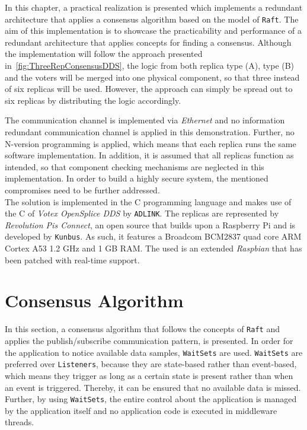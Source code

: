 In this chapter, a practical realization is presented which implements a redundant architecture that applies a consensus algorithm based on the model of \texttt{Raft}.
The aim of this implementation is to showcase the practicability and performance of a redundant architecture that applies  concepts for finding a consensus.
Although the implementation will follow the approach presented in~\autoref{fig:ThreeRepConsensusDDS}, the logic from both replica type (A), type (B) and the voters will be merged into one physical component, so that three instead of six replicas will be used.
However, the approach can simply be spread out to six replicas by distributing the logic accordingly.

The communication channel is implemented via \textit{Ethernet} and no information redundant communication channel is applied in this demonstration.
Further, no N-version programming is applied, which means that each replica runs the same software implementation.
In addition, it is assumed that all replicas function as intended, so that component checking mechanisms are neglected in this implementation.
In order to build a highly secure system, the mentioned compromises need to be further addressed.
\\

The solution is implemented in the C programming language and makes use of the C  of \textit{Votex OpenSplice DDS} by \texttt{ADLINK}.
The replicas are represented by \textit{Revolution Pis Connect}, an open source  that builds upon a Raspberry Pi and is developed by \texttt{Kunbus}.
As such, it features a Broadcom BCM2837 quad core ARM Cortex A53 1.2 GHz  and 1 GB RAM.
The used  is an extended \textit{Raspbian}  that has been patched with real-time support.


\section{Consensus Algorithm}

In this section, a consensus algorithm that follows the concepts of \texttt{Raft} and applies the  publish/subscribe communication pattern, is presented.
In order for the application to notice available data samples, \texttt{WaitSets} are used.
\texttt{WaitSets} are preferred over \texttt{Listeners}, because they are state-based rather than event-based, which means they trigger as long as a certain state is present rather than when an event is triggered.
Thereby, it can be ensured that no available data is missed.
Further, by using \texttt{WaitSets}, the entire control about the application is managed by the application itself and no application code is executed in middleware threads.
\\

